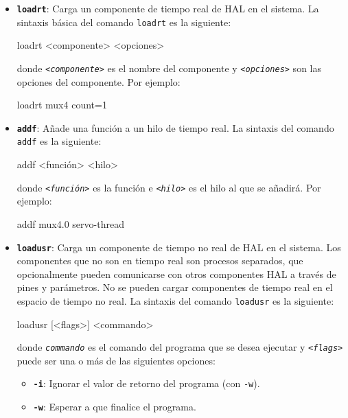 \documentclass[english,spanish,a4paper,11pt]{article}
\begin{document}
\begin{itemize}
    \item \textbf{\texttt{loadrt}}: Carga un componente de tiempo real de \ac{HAL} en el sistema. La sintaxis básica del comando \texttt{loadrt} es la siguiente:
\begin{listingbox}[][language=example]
loadrt <componente> <opciones>
\end{listingbox}
    donde \textit{\texttt{<componente>}} es el nombre del componente y \textit{\texttt{<opciones>}} son las opciones del componente. Por ejemplo:
\begin{listingbox}
loadrt mux4 count=1
\end{listingbox}

    \item \textbf{\texttt{addf}}: Añade una función a un hilo de tiempo real. La sintaxis del comando \texttt{addf} es la siguiente:
\begin{listingbox}[][language=example]
addf <función> <hilo>
\end{listingbox}
    donde \textit{\texttt{<función>}} es la función e   \textit{\texttt{<hilo>}} es el hilo al que se añadirá. Por ejemplo:
\begin{listingbox}
addf mux4.0 servo-thread
\end{listingbox}

    \item \textbf{\texttt{loadusr}}: Carga un componente de tiempo no real de \ac{HAL} en el sistema. Los componentes que no son en tiempo real son procesos separados, que opcionalmente pueden comunicarse con otros componentes \ac{HAL} a través de pines y parámetros. No se pueden cargar componentes de tiempo real en el espacio de tiempo no real. La sintaxis del comando \texttt{loadusr} es la siguiente:
\begin{listingbox}[][language=example]
loadusr [<flags>] <commando>
\end{listingbox}
    donde \textit{\texttt{commando}} es el comando del programa que se desea ejecutar y \textit{\texttt{<flags>}} puede ser una o más de las siguientes opciones:
    \begin{itemize}     
        \item \textbf{\texttt{-i}}: Ignorar el valor de retorno del programa (con \texttt{-w}).
        
        \item \textbf{\texttt{-w}}: Esperar a que finalice el programa.
        

\end{itemize}
\end{itemize}
\end{document}
